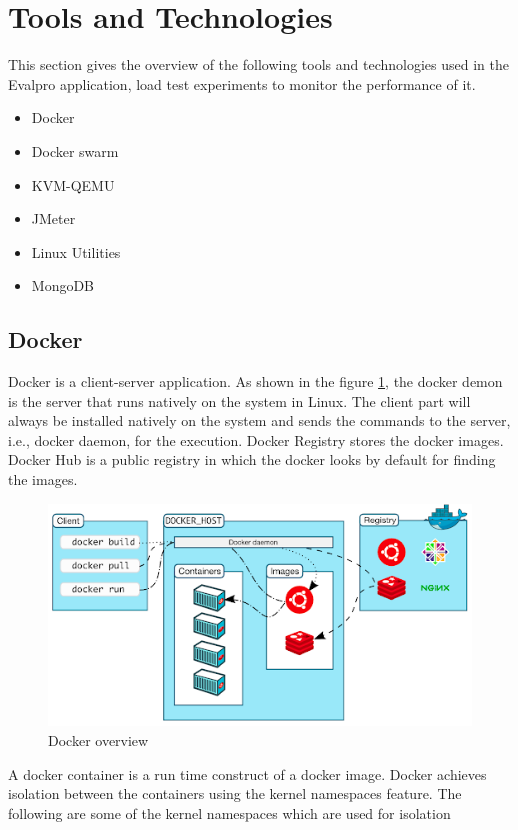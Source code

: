 \documentclass{iitbreport}
\begin{document}
\section{Tools and Technologies}\label{tools_technologies}
This section gives the overview of the following tools and technologies used in the Evalpro application, load test experiments to monitor the performance of it.
\begin{itemize}
    \item Docker
    \item {Docker swarm}
    \item {KVM-QEMU }
    \item {JMeter}
    \item {Linux Utilities}
    \item {MongoDB}
\end{itemize}
\subsection{Docker}
Docker \cite{docker} is a client-server application. As shown in the figure \ref{fig:Docker},  the docker demon is the server that runs natively on the system in Linux. The client part will always be installed natively on the system and sends the commands to the server, i.e., docker daemon, for the execution. Docker Registry stores the docker images. Docker Hub is a public registry in which the docker looks by default for finding the images.
\begin{figure}[!htb]
            \centering
            \includegraphics[width=\linewidth]{Images/docker.png}
            \caption{Docker overview \cite{docker_overview}}
            \label{fig:Docker}
\end{figure}
A docker container is a run time construct of a docker image. Docker achieves isolation between the containers using the kernel namespaces feature. The following are some of the kernel namespaces which are used for isolation
\end{document}
